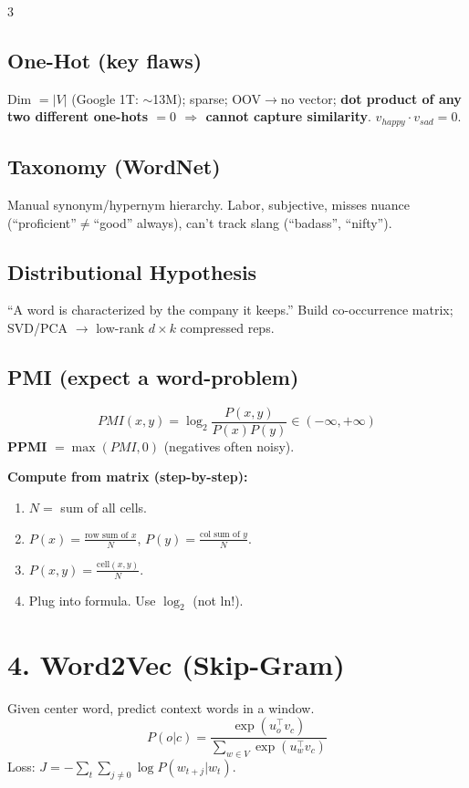 \documentclass[8pt,a4paper,landscape]{extarticle}
\begin{document}
\begin{multicols*}{3}
    \subsection*{One-Hot (key flaws)}
    Dim $=|V|$ (Google 1T: $\sim$13M); sparse; OOV$\to$no vector; \textbf{dot product of any two different one-hots $=0$ $\Rightarrow$ cannot capture similarity}. $v_{happy}\cdot v_{sad}=0$.

    \subsection*{Taxonomy (WordNet)}
    Manual synonym/hypernym hierarchy. Labor, subjective, misses nuance (``proficient''$\ne$``good'' always), can't track slang (``badass'', ``nifty'').

    \subsection*{Distributional Hypothesis}
    ``A word is characterized by the company it keeps.'' Build co-occurrence matrix; SVD/PCA $\to$ low-rank $d{\times}k$ compressed reps.

    \subsection*{PMI (expect a word-problem)}
    \[PMI(x,y)=\log_2\frac{P(x,y)}{P(x)P(y)}\in(-\infty,+\infty)\]
    \textbf{PPMI} $=\max(PMI,0)$ (negatives often noisy).

    \textbf{Compute from matrix (step-by-step):}
    \begin{enumerate}
        \item $N=$ sum of all cells.
        \item $P(x)=\tfrac{\text{row sum of }x}{N}$, $P(y)=\tfrac{\text{col sum of }y}{N}$.
        \item $P(x,y)=\tfrac{\text{cell}(x,y)}{N}$.
        \item Plug into formula. Use $\log_2$ (not ln!).
    \end{enumerate}

    \section*{4. Word2Vec (Skip-Gram)}
    Given center word, predict context words in a window.
    \[P(o|c)=\frac{\exp(u_o^\top v_c)}{\sum_{w\in V}\exp(u_w^\top v_c)}\]
    Loss: $J=-\sum_t\sum_{j\neq 0}\log P(w_{t+j}|w_t)$.


\end{multicols*}
\end{document}
